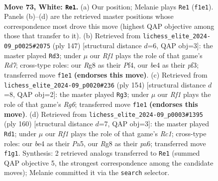 \documentclass[11pt]{article}
\begin{document}
\clearpage

\begin{figure}[p]\centering
\begin{subfigure}{0.46\textwidth}\centering
\resizebox{\linewidth}{!}{%
\newchessgame
\chessboard[
  setfen={6R1/8/3k4/8/1P2b3/8/7r/3K1R2 w - - 19 73},
  showmover=false,
  pgfstyle=straightmove, color=movearrow, markmove={f1-e1}
]}
\caption{}
\end{subfigure}\hfill
\begin{subfigure}{0.46\textwidth}\centering
\resizebox{\linewidth}{!}{%
\newchessgame
\chessboard[
  setfen={8/8/4R3/8/3k1p2/5P2/3r4/6K1 b - - 7 74},
  showmover=false,
  pgfstyle=straightmove, color=movearrow, markmove={d2-d3}
]}
\caption{}
\end{subfigure}
\\[4pt]
\begin{subfigure}{0.46\textwidth}\centering
\resizebox{\linewidth}{!}{%
\newchessgame
\chessboard[
  setfen={8/5r2/6R1/8/R7/8/3k2K1/8 w - - 7 78},
  showmover=false,
  pgfstyle=straightmove, color=movearrow, markmove={g6-g3}
]}
\caption{}
\end{subfigure}\hfill
\begin{subfigure}{0.46\textwidth}\centering
\resizebox{\linewidth}{!}{%
\newchessgame
\chessboard[
  setfen={8/8/p7/P7/8/k7/7r/K1R5 w - - 8 81},
  showmover=false,
  pgfstyle=straightmove, color=movearrow, markmove={c1-d1}
]}
\caption{}
\end{subfigure}
\caption{\textbf{Move 73, White: \texttt{Re1}.} (a) Our position; Melanie plays \texttt{Re1} (\texttt{f1e1}). Panels (b)--(d) are the retrieved master positions whose correspondence most drove this move (highest QAP objective among those that transfer to it). (b) Retrieved from \texttt{lichess\_elite\_2024-09\_p0025\#2075} (ply 147) [structural distance $d$=6, QAP obj=3]: the master played \texttt{Rd3}; under $\mu$ our \emph{Rf1} plays the role of that game's \emph{Rd7}; cross-type roles: our \emph{R}g8 as their \emph{P}f4, our \emph{b}e4 as their \emph{p}f3; transferred move \texttt{f1e1} \textbf{(endorses this move)}. (c) Retrieved from \texttt{lichess\_elite\_2024-09\_p0020\#236} (ply 154) [structural distance $d$=8, QAP obj=2]: the master played \texttt{Rg3}; under $\mu$ our \emph{Rf1} plays the role of that game's \emph{Rg6}; transferred move \texttt{f1e1} \textbf{(endorses this move)}. (d) Retrieved from \texttt{lichess\_elite\_2024-09\_p0003\#1395} (ply 160) [structural distance $d$=7, QAP obj=3]: the master played \texttt{Rd1}; under $\mu$ our \emph{Rf1} plays the role of that game's \emph{Rc1}; cross-type roles: our \emph{b}e4 as their \emph{P}a5, our \emph{R}g8 as their \emph{p}a6; transferred move \texttt{f1g1}. Synthesis: 2 retrieved analogs transferred to \texttt{Re1} (summed QAP objective 5, the strongest correspondence among the candidate moves); Melanie committed it via the \texttt{search} selector.}
\label{fig:thought-m144}
\end{figure}
\end{document}
